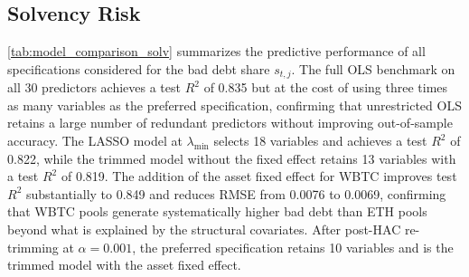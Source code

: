 \documentclass[a4paper,UKenglish,cleveref, autoref, thm-restate]{informs3}
\begin{document}
\subsection{Solvency Risk}
\label{app:model_comparison_solv}

\autoref{tab:model_comparison_solv} summarizes the predictive
performance of all specifications considered for the bad debt
share $s_{t,j}$. The full OLS benchmark on all 30 predictors
achieves a test $R^2$ of 0.835 but at the cost of using three
times as many variables as the preferred specification,
confirming that unrestricted OLS retains a large number of
redundant predictors without improving out-of-sample accuracy.
The LASSO model at $\lambda_{\min}$ selects 18 variables and
achieves a test $R^2$ of 0.822, while the trimmed model without
the fixed effect retains 13 variables with a test $R^2$ of
0.819. The addition of the asset fixed effect for WBTC improves
test $R^2$ substantially to 0.849 and reduces RMSE from 0.0076
to 0.0069, confirming that WBTC pools generate systematically
higher bad debt than ETH pools beyond what is explained by the
structural covariates. After post-HAC re-trimming at
$\alpha = 0.001$, the preferred specification retains 10
variables and is the trimmed model with the asset fixed effect.
\end{document}
